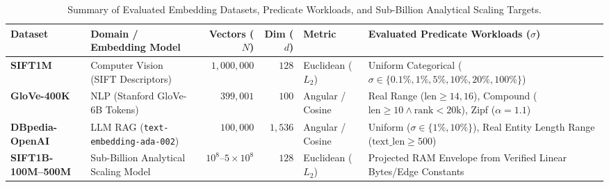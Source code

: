 
\begin{table}[t]
\centering
\caption{Summary of Evaluated Embedding Datasets, Predicate Workloads, and Sub-Billion Analytical Scaling Targets.}
\label{tab:datasets}
\small
\begin{tabular}{@{}llrrll@{}}
\toprule
\textbf{Dataset} & \textbf{Domain / Embedding Model} & \textbf{Vectors ($N$)} & \textbf{Dim ($d$)} & \textbf{Metric} & \textbf{Evaluated Predicate Workloads ($\sigma$)} \\
\midrule
\textbf{SIFT1M} & Computer Vision (SIFT Descriptors) & $1{,}000{,}000$ & $128$ & Euclidean ($L_2$) & Uniform Categorical ($\sigma \in \{0.1\%, 1\%, 5\%, 10\%, 20\%, 100\%\}$) \\
\textbf{GloVe-400K} & NLP (Stanford GloVe-6B Tokens) & $399{,}001$ & $100$ & Angular / Cosine & Real Range ($\text{len}\ge 14,16$), Compound ($\text{len}\ge 10 \wedge \text{rank}<20\text{k}$), Zipf ($\alpha=1.1$) \\
\textbf{DBpedia-OpenAI} & LLM RAG (\texttt{text-embedding-ada-002}) & $100{,}000$ & $1{,}536$ & Angular / Cosine & Uniform ($\sigma \in \{1\%, 10\%\}$), Real Entity Length Range ($\text{text\_len}\ge 500$) \\
\midrule
\textbf{SIFT1B-100M--500M} & Sub-Billion Analytical Scaling Model & $10^8 \text{--} 5\times 10^8$ & $128$ & Euclidean ($L_2$) & Projected RAM Envelope from Verified Linear Bytes/Edge Constants \\
\bottomrule
\end{tabular}
\end{table}

